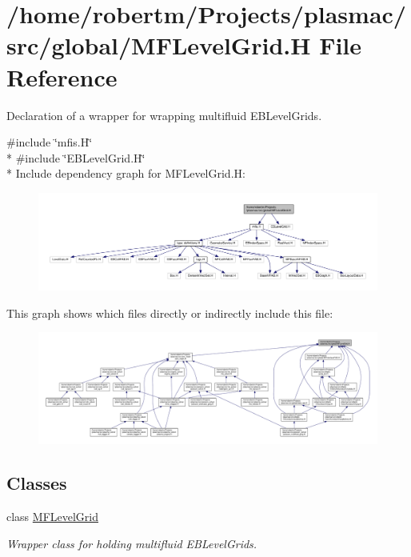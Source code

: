 \hypertarget{MFLevelGrid_8H}{}\section{/home/robertm/\+Projects/plasmac/src/global/\+M\+F\+Level\+Grid.H File Reference}
\label{MFLevelGrid_8H}


Declaration of a wrapper for wrapping multifluid E\+B\+Level\+Grids.  


{\ttfamily \#include \char`\"{}mfis.\+H\char`\"{}}\\*
{\ttfamily \#include \char`\"{}E\+B\+Level\+Grid.\+H\char`\"{}}\\*
Include dependency graph for M\+F\+Level\+Grid.\+H\+:\nopagebreak
\begin{figure}[H]
\begin{center}
\leavevmode
\includegraphics[width=350pt]{MFLevelGrid_8H__incl}
\end{center}
\end{figure}
This graph shows which files directly or indirectly include this file\+:\nopagebreak
\begin{figure}[H]
\begin{center}
\leavevmode
\includegraphics[width=350pt]{MFLevelGrid_8H__dep__incl}
\end{center}
\end{figure}
\subsection*{Classes}
\begin{DoxyCompactItemize}
\item 
class \hyperlink{classMFLevelGrid}{M\+F\+Level\+Grid}
\begin{DoxyCompactList}\small\item\em Wrapper class for holding multifluid E\+B\+Level\+Grids. \end{DoxyCompactList}\end{DoxyCompactItemize}


